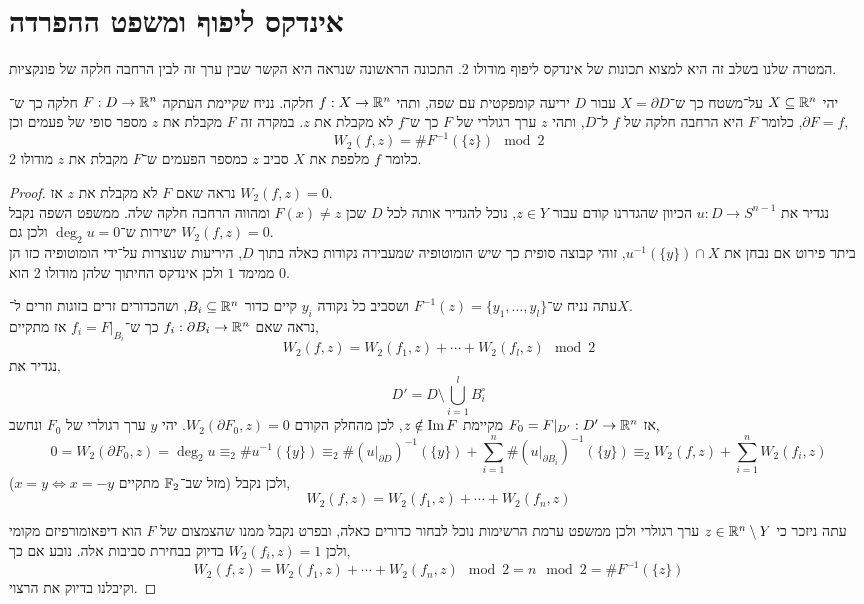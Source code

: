 \section{אינדקס ליפוף ומשפט ההפרדה}
המטרה שלנו בשלב זה היא למצוא תכונות של אינדקס ליפוף מודולו 2.
התכונה הראשונה שנראה היא הקשר שבין ערך זה לבין הרחבה חלקה של פונקציות.
\begin{theorem}
	יהי $X \subseteq \mathbb{R}^n$ על־משטח כך ש־$X = \partial D$ עבור $D$ יריעה קומפקטית עם שפה, ותהי $f : X \to \mathbb{R}^n$ חלקה.
	נניח שקיימת העתקה $F : D \to \mathbb{R}^n$ חלקה כך ש־$\partial F = f$, כלומר $F$ היא הרחבה חלקה של $f$ ל־$D$, ותהי $z$ ערך רגולרי של $F$ כך ש־$f$ לא מקבלת את $z$.
	במקרה זה $F$ מקבלת את $z$ מספר סופי של פעמים וכן,
	\[
		W_2(f, z)
		= \# F^{-1}(\{ z \}) \mod 2
	\]
	כלומר $f$ מלפפת את $X$ סביב $z$ כמספר הפעמים ש־$F$ מקבלת את $z$ מודולו 2.
\end{theorem}
\begin{proof}
	נראה שאם $F$ לא מקבלת את $z$ אז $W_2(f, z) = 0$. \\
	נגדיר את $u : D \to S^{n - 1}$ הכיוון שהגדרנו קודם עבור $z \in Y$, נוכל להגדיר אותה לכל $D$ שכן $F(x) \ne z$ ומהווה הרחבה חלקה שלה.
	ממשפט השפה נקבל ישירות ש־$\deg_2 u = 0$ ולכן גם $W_2(f, z) = 0$. \\
	ביתר פירוט אם נבחן את $u^{-1}(\{ y \}) \cap X$, זוהי קבוצה סופית כך שיש הומוטופיה שמעבירה נקודות כאלה בתוך $D$, היריעות שנוצרות על־ידי הומוטופיה כזו הן ממימד $1$ ולכן אינדקס החיתוך שלהן מודולו 2 הוא $0$.

	עתה נניח ש־$F^{-1}(z) = \{ y_1, \ldots, y_l \}$ ושסביב כל נקודה $y_i$ קיים כדור $B_i \subseteq \mathbb{R}^n$, ושהכדורים זרים בזוגות וזרים ל־$X$. \\
	נראה שאם $f_i : \partial B_i \to \mathbb{R}^n$ כך ש־$f_i = F |_{B_i}$ אז מתקיים,
	\[
		W_2(f, z)
		= W_2(f_1, z) + \cdots + W_2(f_l, z) \mod 2
	\]
	נגדיר את,
	\[
		D'
		= D \setminus \bigcup_{i = 1}^l B_i^\circ
	\]
	אז $F_0 = F |_{D'} : D' \to \mathbb{R}^n$ מקיימת $z \notin \operatorname{Im} F$, לכן מהחלק הקודם $W_2(\partial F_0, z) = 0$.
	יהי $y$ ערך רגולרי של $F_0$ ונחשב,
	\[
		0
		= W_2(\partial F_0, z)
		= \deg_2 u
		\equiv_2 \# u^{-1}(\{ y \})
		\equiv_2 \# {(u |_{\partial D})}^{-1}(\{ y \}) + \sum_{i = 1}^n \# {(u |_{\partial B_i})}^{-1}(\{ y \})
		\equiv_2 W_2(f, z) + \sum_{i = 1}^n W_2(f_i, z)
	\]
	ולכן נקבל (מזל שב־$\mathbb{F}_2$ מתקיים $x = y \iff x = - y$),
	\[
		W_2(f, z)
		= W_2(f_1, z) + \cdots + W_2(f_n, z)
	\]

	עתה ניזכר כי $z \in \mathbb{R}^n \setminus Y$ ערך רגולרי ולכן ממשפט ערמת הרשימות נוכל לבחור כדורים כאלה,
	ובפרט נקבל ממנו שהצמצום של $F$ הוא דיפאומורפיזם מקומי ולכן $W_2(f_i, z) = 1$ בדיוק בבחירת סביבות אלה.
	נובע אם כך,
	\[
		W_2(f, z)
		= W_2(f_1, z) + \cdots + W_2(f_n, z) \mod 2
		= n \mod 2
		= \# F^{-1}(\{ z \})
	\]
	וקיבלנו בדיוק את הרצוי.
\end{proof}
